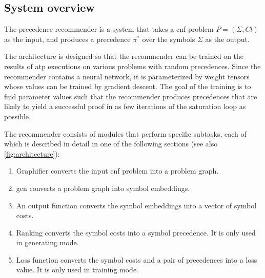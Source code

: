 \fi

\subsection{System overview}

The precedence recommender is a system that takes
a \gls{cnf} problem $P = (\Sigma, \mathit{Cl})$ as the input,
and produces a precedence $\pi^*$ over the symbols $\Sigma$ as the output.

The architecture is designed so that the recommender can be trained
on the results of \gls{atp} executions on various problems with random precedences.
Since the recommender contains a neural network,
it is parameterized by weight tensors
whose values can be trained by gradient descent.
The goal of the training is to find parameter values such that the recommender produces precedences
that are likely to yield a successful proof in as few iterations of the saturation loop as possible.

The recommender consists of modules that perform specific subtasks,
each of which is described in detail in one of the following sections (see also \cref{fig:architecture}):
\begin{enumerate}
\item Graphifier converts the input \gls{cnf} problem into a problem graph.
\item \Gls{gcn} converts a problem graph into symbol embeddings.
\item An output function \cite{Zhou2018} converts the symbol embeddings into a vector of symbol costs.
\item Ranking converts the symbol costs into a symbol precedence.
It is only used in generating mode.
\item Loss function converts the symbol costs and a pair of precedences into a loss value.
It is only used in training mode.
\end{enumerate}

